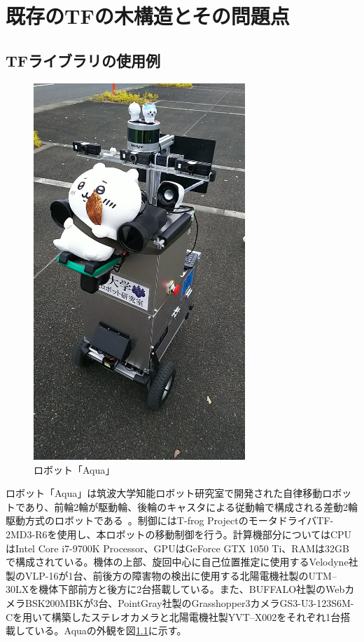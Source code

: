 \documentclass[a4paper]{jreport}	%
\begin{document}
\chapter{既存のTFの木構造とその問題点}
\section{TFライブラリの使用例}

\begin{figure}[h] 
\centering
\includegraphics[width=8cm]{aqua.jpeg}	
\caption{ロボット「Aqua」}
\label{fig:aqua}
\end{figure}


ロボット「Aqua」は筑波大学知能ロボット研究室で開発された自律移動ロボットであり、前輪2輪が駆動輪、後輪のキャスタによる従動輪で構成される差動2輪駆動方式のロボットである~\cite{Aqua}。制御にはT-frog ProjectのモータドライバTF-2MD3-R6を使用し、本ロボットの移動制御を行う。計算機部分についてはCPUはIntel Core i7-9700K Processor、GPUはGeForce GTX 1050 Ti、RAMは32GBで構成されている。機体の上部、旋回中心に自己位置推定に使用するVelodyne社製のVLP-16が1台、前後方の障害物の検出に使用する北陽電機社製のUTM--30LXを機体下部前方と後方に2台搭載している。また、BUFFALO社製のWebカメラBSK200MBKが3台、PointGray社製のGrasshopper3カメラGS3-U3-123S6M-Cを用いて構築したステレオカメラと北陽電機社製YVT--X002をそれぞれ1台搭載している。Aquaの外観を図\ref{fig:aqua}に示す。
\end{document}
